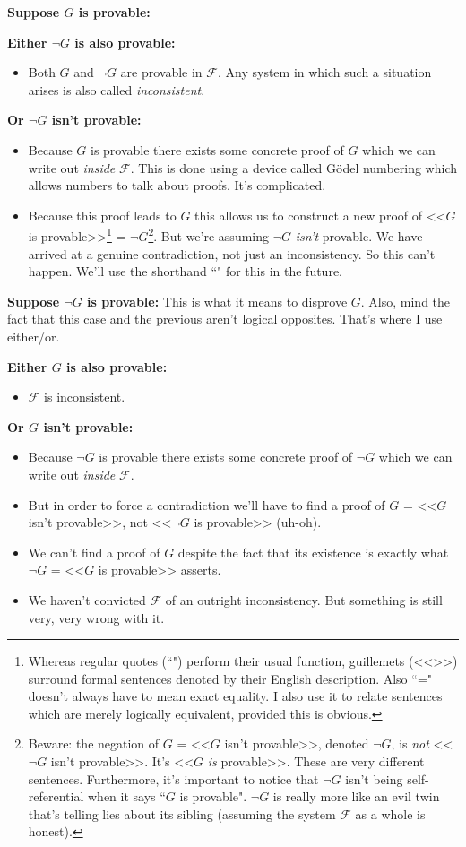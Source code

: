 \documentclass{article}
\newcommand{\nameditem}[1]{\item\textbf{#1}}
\newcommand{\impl}{\item[$\Rightarrow$]}
\newcommand{\F}{\ensuremath{\mathcal{F}}}
\begin{document}
\begin{description}
\nameditem{Suppose $G$ is provable:}
\begin{description}
\nameditem{Either $\neg G$ is also provable:}
\begin{itemize}
\impl Both $G$ and $\neg G$ are provable in $\F$. Any system in which such a situation arises is also called \textit{inconsistent}.
\end{itemize}
\nameditem{Or $\neg G$ isn't provable:}
\begin{itemize}
\impl Because $G$ is provable there exists some concrete proof of $G$ which we can write out \textit{inside} $\F$. This is done using a device called Gödel numbering which allows numbers to talk about proofs. It's complicated.
\impl Because this proof leads to $G$ this allows us to construct a new proof of <<$G$ is provable>>\footnote{Whereas regular quotes (``") perform their usual function, guillemets (<<>>) surround formal sentences denoted by their English description. Also ``=" doesn't always have to mean exact equality. I also use it to relate sentences which are merely logically equivalent, provided this is obvious.} = $\neg G$\footnote{Beware: the negation of $G$ = <<$G$ isn't provable>>, denoted $\neg G$, is \textit{not} <<$\neg G$ isn't provable>>. It's <<$G$ \textit{is} provable>>. These are very different sentences. Furthermore, it's important to notice that $\neg G$ isn't being self-referential when it says ``$G$ is provable". $\neg G$ is really more like an evil twin that's telling lies about its sibling (assuming the system $\F$  as a whole is honest).}. But we're assuming $\neg G$ \textit{isn't} provable. We have arrived at a genuine contradiction, not just an inconsistency. So this can't happen. We'll use the shorthand ``\lightning" for this in the future.
\end{itemize}
\end{description}
\nameditem{Suppose $\neg G$ is provable:}
This is what it means to disprove $G$. Also, mind the fact that this case and the previous aren't logical opposites. That's where I use either/or.
\begin{description}
\nameditem{Either $G$ is also provable:}
\begin{itemize}
\impl $\F$ is inconsistent.
\end{itemize}
\nameditem{Or $G$ isn't provable:}
\begin{itemize}
\impl Because $\neg G$ is provable there exists some concrete proof of $\neg G$ which we can write out \textit{inside} $\F$.
\impl But in order to force a contradiction we'll have to find a proof of $G$ = <<$G$ isn't provable>>, not <<$\neg G$ is provable>> (uh-oh).
\impl We can't find a proof of $G$ despite the fact that its existence is exactly what $\neg G$ = <<$G$ is provable>> asserts.
\impl We haven't convicted $\F$ of an outright inconsistency. But something is still very, very wrong with it.
\end{itemize}
\end{description}
\end{description}
\end{document}
